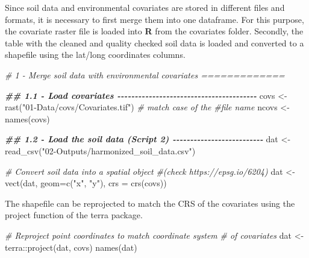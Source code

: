 \documentclass[
  10pt,
  b5paper,
  oneside]{book}
\newenvironment{Shaded}{\begin{snugshade}}{\end{snugshade}}
\newcommand{\AttributeTok}[1]{\textcolor[rgb]{0.77,0.63,0.00}{#1}}
\newcommand{\CommentTok}[1]{\textcolor[rgb]{0.56,0.35,0.01}{\textit{#1}}}
\newcommand{\DocumentationTok}[1]{\textcolor[rgb]{0.56,0.35,0.01}{\textbf{\textit{#1}}}}
\newcommand{\FunctionTok}[1]{\textcolor[rgb]{0.00,0.00,0.00}{#1}}
\newcommand{\NormalTok}[1]{#1}
\newcommand{\OtherTok}[1]{\textcolor[rgb]{0.56,0.35,0.01}{#1}}
\newcommand{\SpecialCharTok}[1]{\textcolor[rgb]{0.00,0.00,0.00}{#1}}
\newcommand{\StringTok}[1]{\textcolor[rgb]{0.31,0.60,0.02}{#1}}
\begin{document}
Since soil data and environmental covariates are stored in different files and formats, it is necessary to first merge them into one dataframe. For this purpose, the covariate raster file is loaded into \textbf{R} from the covariates folder. Secondly, the table with the cleaned and quality checked soil data is loaded and converted to a shapefile using the lat/long coordinates columns.

\begin{Shaded}
\begin{Highlighting}[]
\CommentTok{\# 1 {-} Merge soil data with environmental covariates =============}

\DocumentationTok{\#\# 1.1 {-} Load covariates {-}{-}{-}{-}{-}{-}{-}{-}{-}{-}{-}{-}{-}{-}{-}{-}{-}{-}{-}{-}{-}{-}{-}{-}{-}{-}{-}{-}{-}{-}{-}{-}{-}{-}{-}{-}{-}{-}{-}{-}}
\NormalTok{covs }\OtherTok{\textless{}{-}} \FunctionTok{rast}\NormalTok{(}\StringTok{"01{-}Data/covs/Covariates.tif"}\NormalTok{) }\CommentTok{\# match case of the }
\CommentTok{\#file name}
\NormalTok{ncovs }\OtherTok{\textless{}{-}} \FunctionTok{names}\NormalTok{(covs)}

\DocumentationTok{\#\# 1.2 {-} Load the soil data (Script 2) {-}{-}{-}{-}{-}{-}{-}{-}{-}{-}{-}{-}{-}{-}{-}{-}{-}{-}{-}{-}{-}{-}{-}{-}{-}{-}}
\NormalTok{dat }\OtherTok{\textless{}{-}} \FunctionTok{read\_csv}\NormalTok{(}\StringTok{"02{-}Outputs/harmonized\_soil\_data.csv"}\NormalTok{)}

\CommentTok{\# Convert soil data into a spatial object}
\CommentTok{\#(check https://epsg.io/6204)}
\NormalTok{dat }\OtherTok{\textless{}{-}} \FunctionTok{vect}\NormalTok{(dat, }\AttributeTok{geom=}\FunctionTok{c}\NormalTok{(}\StringTok{"x"}\NormalTok{, }\StringTok{"y"}\NormalTok{), }\AttributeTok{crs =} \FunctionTok{crs}\NormalTok{(covs))}
\end{Highlighting}
\end{Shaded}

The shapefile can be reprojected to match the CRS of the covariates using the project function of the terra package.

\begin{Shaded}
\begin{Highlighting}[]
\CommentTok{\# Reproject point coordinates to match coordinate system }
\CommentTok{\# of covariates}
\NormalTok{dat }\OtherTok{\textless{}{-}}\NormalTok{ terra}\SpecialCharTok{::}\FunctionTok{project}\NormalTok{(dat, covs)}
\FunctionTok{names}\NormalTok{(dat) }
\end{Highlighting}
\end{Shaded}
\end{document}
